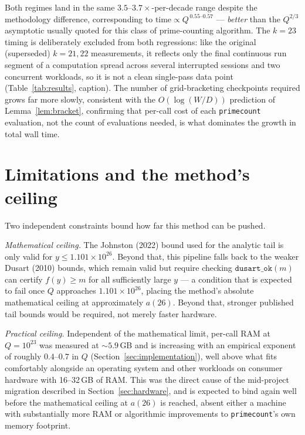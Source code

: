\documentclass[11pt]{amsart}
\begin{document}
Both regimes land in the same $3.5$--$3.7\times$-per-decade range despite
the methodology difference, corresponding to $\text{time} \propto
Q^{\,0.55\text{--}0.57}$ --- \emph{better} than the $Q^{2/3}$ asymptotic
usually quoted for this class of prime-counting algorithm. The $k=23$
timing is deliberately excluded from both regressions: like the original
(superseded) $k=21,22$ measurements, it reflects only the final
continuous run segment of a computation spread across several
interrupted sessions and two concurrent workloads, so it is not a clean
single-pass data point (Table~\ref{tab:results}, caption). The number of
grid-bracketing checkpoints required grows far more slowly, consistent
with the $O(\log(W/D))$ prediction of Lemma~\ref{lem:bracket}, confirming
that per-call cost of each \texttt{primecount} evaluation, not the count
of evaluations needed, is what dominates the growth in total wall time.

\section{Limitations and the method's ceiling}
\label{sec:ceiling}

Two independent constraints bound how far this method can be pushed.

\emph{Mathematical ceiling.} The Johnston (2022) bound used for the
analytic tail is only valid for $y \leq 1.101\times10^{26}$. Beyond that,
this pipeline falls back to the weaker Dusart (2010) bounds, which remain
valid but require checking $\texttt{dusart\_ok}(m)$ can certify $f(y)
\geq m$ for all sufficiently large $y$ --- a condition that is expected
to fail once $Q$ approaches $1.101\times10^{26}$, placing the method's
absolute mathematical ceiling at approximately $a(26)$. Beyond that,
stronger published tail bounds would be required, not merely faster
hardware.

\emph{Practical ceiling.} Independent of the mathematical limit,
per-call RAM at $Q=10^{23}$ was measured at $\sim\!5.9$\,GB and is
increasing with an empirical exponent of roughly $0.4$--$0.7$ in $Q$
(Section~\ref{sec:implementation}), well above what fits comfortably
alongside an operating system and other workloads on consumer hardware
with 16--32\,GB of RAM. This was the direct cause of the mid-project
migration described in Section~\ref{sec:hardware}, and is expected to
bind again well before the mathematical ceiling at $a(26)$ is reached,
absent either a machine with substantially more RAM or algorithmic
improvements to \texttt{primecount}'s own memory footprint.
\end{document}
